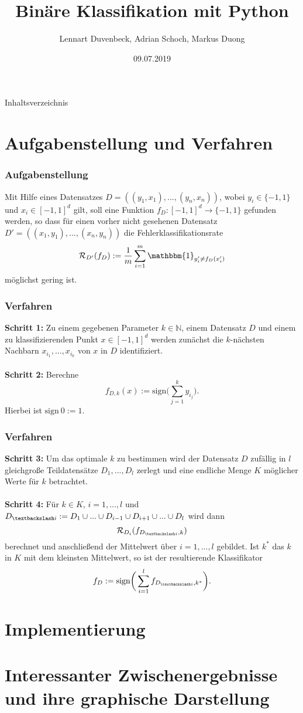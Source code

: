 \documentclass{beamer}
\title{Binäre Klassifikation mit Python}
\author{Lennart Duvenbeck, Adrian Schoch, Markus Duong}
\date{09.07.2019}
\begin{document}
\maketitle
\begin{frame}{Inhaltsverzeichnis}
  \tableofcontents
\end{frame}

\section{Aufgabenstellung und Verfahren}
\begin{frame} %
\frametitle{Aufgabenstellung} %
Mit Hilfe eines Datensatzes $D = ((y_{1},x_{1}),...,(y_{n},x_{n}))$, wobei $y_{i} \in \{-1,1\}$ und $x_{i} \in [-1,1]^{d}$ gilt, soll eine Funktion $f_{D}: [-1,1]^{d} \rightarrow \{-1,1\}$ gefunden werden, so dass für einen vorher nicht gesehenen Datensatz $D' = ((x_{1},y_{1}),...,(x_{n},y_{n}))$ die Fehlerklassifikationsrate 
\[
\mathcal{R}_{D'}(f_{D}) := \frac{1}{m} \sum_{i=1}^{m} \mathbbm{1}_{y_{i}' \neq f_{D}(x_{i}')}
\]
möglichst gering ist.
\end{frame}

\begin{frame} %
\frametitle{Verfahren} %
\textbf{Schritt 1:} Zu einem gegebenen Parameter $k \in \mathbb{N}$, einem Datensatz $D$ und einem zu klassifizierenden Punkt $x \in [-1,1]^{d}$ werden zunächst die $k$-nächsten Nachbarn $x_{i_{1}},...,x_{i_{k}}$ von $x$ in $D$ identifiziert. \\
\ \\
\textbf{Schritt 2:} Berechne
\[
f_{D,k}(x) := \text{sign} \bigg( \sum_{j =1}^{k} y_{i_{j}}\bigg).
\]
Hierbei ist $\text{sign} \: 0 := 1$.
\end{frame}

\begin{frame} %
\frametitle{Verfahren} %
\textbf{Schritt 3:}  Um das \glqq optimale\grqq{} $k$ zu bestimmen wird der Datensatz $D$ zufällig in $l$ gleichgroße Teildatensätze $D_{1},...,D_{l}$ zerlegt und eine endliche Menge $K$ möglicher Werte für $k$ betrachtet.\\
\ \\
\textbf{Schritt 4:} Für $k \in K$, $i = 1,...,l$ und $D_{\textbackslash i} := D_{1} \cup ... \cup D_{i-1} \cup D_{i+1} \cup...\cup D_{l}$ wird dann
\[
\mathcal{R}_{D_{i}}(f_{D_{\textbackslash i}, k})
\]
berechnet und anschließend der Mittelwert über $i = 1,...,l$ gebildet. Ist $k^{*}$ das $k$ in $K$ mit dem kleinsten Mittelwert, so ist der resultierende Klassifikator
\[
f_ {D} := \text{sign} \bigg( \sum_{i=1}^{l} f_{D_{\textbackslash i}, k^{*}}\bigg).
\]
\end{frame}
\section{Implementierung}
\section{Interessanter Zwischenergebnisse und ihre graphische Darstellung}
\end{document}
